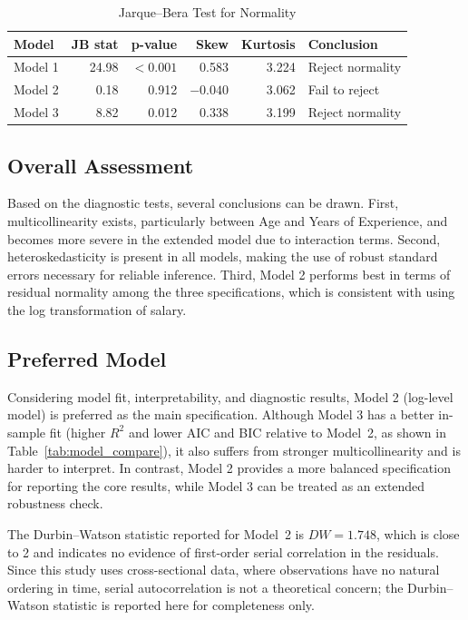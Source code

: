 \documentclass[12pt, a4paper]{article}
\begin{document}
\begin{table}[htpb]
\centering
\caption{Jarque--Bera Test for Normality}
\label{tab:jb}
\begin{tabular}{lrrrrl}
\toprule
\textbf{Model} & \textbf{JB stat} & \textbf{p-value} & \textbf{Skew} & \textbf{Kurtosis} & \textbf{Conclusion} \\
\midrule
Model 1 & 24.98 & $< 0.001$ & 0.583 & 3.224 & Reject normality \\
Model 2 & 0.18 & 0.912 & $-0.040$ & 3.062 & Fail to reject \\
Model 3 & 8.82 & 0.012 & 0.338 & 3.199 & Reject normality \\
\bottomrule
\end{tabular}
\end{table}

\subsection{Overall Assessment}
Based on the diagnostic tests, several conclusions can be drawn.
First, multicollinearity exists, particularly between Age and Years of Experience, and becomes more severe in the extended model due to interaction terms.
Second, heteroskedasticity is present in all models, making the use of robust standard errors necessary for reliable inference.
Third, Model 2 performs best in terms of residual normality among the three specifications, which is consistent with using the log transformation of salary.

\subsection{Preferred Model}
Considering model fit, interpretability, and diagnostic results, Model 2 (log-level model) is preferred as the main specification.
Although Model 3 has a better in-sample fit (higher $R^2$ and lower AIC and BIC relative to Model~2, as shown in Table~\ref{tab:model_compare}), it also suffers from stronger multicollinearity and is harder to interpret. In contrast, Model 2 provides a more balanced specification for reporting the core results, while Model 3 can be treated as an extended robustness check.

The Durbin--Watson statistic reported for Model~2 is $DW = 1.748$, which is close to 2 and indicates no evidence of first-order serial correlation in the residuals. Since this study uses cross-sectional data, where observations have no natural ordering in time, serial autocorrelation is not a theoretical concern; the Durbin--Watson statistic is reported here for completeness only.
\end{document}
